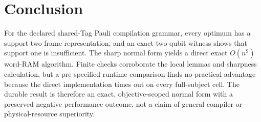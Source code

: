 \section{Conclusion}

For the declared shared-Tag Pauli compilation grammar, every optimum has a support-two frame representation, and an exact two-qubit witness shows that support one is insufficient. The sharp normal form yields a direct exact $O(n^9)$ word-RAM algorithm. Finite checks corroborate the local lemmas and sharpness calculation, but a pre-specified runtime comparison finds no practical advantage because the direct implementation times out on every full-subject cell. The durable result is therefore an exact, objective-scoped normal form with a preserved negative performance outcome, not a claim of general compiler or physical-resource superiority.
